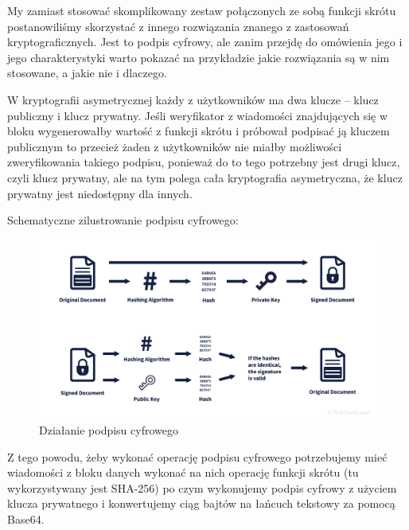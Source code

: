 My zamiast stosować skomplikowany zestaw połączonych ze sobą funkcji skrótu postanowiliśmy skorzystać z innego rozwiązania znanego z zastosowań kryptograficznych. Jest to podpis cyfrowy, ale zanim przejdę do omówienia jego i jego charakterystyki warto pokazać na przykładzie jakie rozwiązania są w nim stosowane, a jakie nie i dlaczego.

\vspace{1em}

W kryptografii asymetrycznej każdy z użytkowników ma dwa klucze – klucz publiczny i klucz prywatny. Jeśli weryfikator z wiadomości znajdujących się w bloku wygenerowałby wartość z funkcji skrótu i próbował podpisać ją kluczem publicznym to przecież żaden z użytkowników nie miałby możliwości zweryfikowania takiego podpisu, ponieważ do to tego potrzebny jest drugi klucz, czyli klucz prywatny, ale na tym polega cała kryptografia asymetryczna, że klucz prywatny jest niedostępny dla innych.

\vspace{1em}

Schematyczne zilustrowanie podpisu cyfrowego:
\begin{figure}[H]
    \centering
    \includegraphics[width=\textwidth]{Images/DSJPG.jpg}
    \caption{Działanie podpisu cyfrowego}
    \label{fig:DSJP}
\end{figure}
Z tego powodu, żeby wykonać operację podpisu cyfrowego potrzebujemy mieć wiadomości z bloku danych wykonać na nich operację funkcji skrótu (tu wykorzystywany jest SHA-256) po czym wykonujemy podpis cyfrowy z użyciem klucza prywatnego i konwertujemy ciąg bajtów na łańcuch tekstowy za pomocą Base64.

